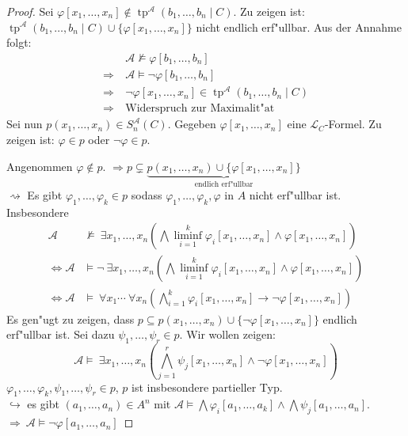 \documentclass[a4paper,12pt,numbers=noenddot,parskip=full]{scrartcl}
\newcommand{\Forall}{~\forall}
\newcommand{\Exists}{~\exists}
\newcommand{\scrL}{\mathcal{L}}
\newcommand{\scrA}{\mathcal{A}}
\DeclareMathOperator{\typ}{tp}
\theoremstyle{dotless}
\begin{document}
\begin{proof}
	Sei $\varphi[x_1, \dots, x_n] \notin \typ^\scrA (b_1, \dots, b_n \mid C)$. Zu zeigen ist: $\typ^\scrA (b_1, \dots, b_n \mid C) \cup \{\varphi[x_1, \dots, x_n] \}$ nicht endlich erf"ullbar. Aus der Annahme folgt:
	\begin{align*}
		&\scrA \not\models \varphi[b_1, \dots, b_n]\\
		\Longrightarrow~ &\scrA \models \lnot \varphi[b_1, \dots, b_n]\\
		\Longrightarrow~ &\lnot \varphi[x_1, \dots, x_n] \in \typ^\scrA(b_1, \dots, b_n \mid C)\\
		\Longrightarrow~ &\text{Widerspruch zur Maximalit"at}
	\end{align*}
	Sei nun $p (x_1, \dots, x_n) \in S^\scrA_n (C)$. Gegeben $\varphi[x_1, \dots, x_n]$ eine $\scrL_C$-Formel. Zu zeigen ist: $\varphi \in p$ oder $\lnot \varphi \in p$.
	
	Angenommen $\varphi \notin p$. $\Longrightarrow p \subsetneq \underbrace{p(x_1, \dots, x_n) \cup \{\varphi[x_1, \dots, x_n] \}}_\text{endlich erf"ullbar}$\\
	$\rightsquigarrow$ Es gibt $\varphi_1, \dots, \varphi_k \in p$ sodass $\varphi_1, \dots, \varphi_k, \varphi$ in $A$ nicht erf"ullbar ist. Insbesondere
	\begin{align*}
		\scrA &\not\models \Exists x_1, \dots, x_n (\bigwedge\liminf_{i=1}^k \varphi_i[x_1, \dots, x_n] \land \varphi[x_1, \dots, x_n])\\
		\Longleftrightarrow \scrA &\models \lnot \Exists x_1, \dots, x_n (\bigwedge\liminf_{i=1}^k \varphi_i[x_1, \dots, x_n] \land \varphi[x_1, \dots, x_n])\\
		\Longleftrightarrow \scrA &\models \Forall x_1 \cdots \Forall x_n (\bigwedge\limits_{i=1}^k \varphi_i[x_1, \dots, x_n] \rightarrow \lnot \varphi[x_1, \dots, x_n])
	\end{align*}
	Es gen"ugt zu zeigen, dass $p \subseteq p(x_1, \dots, x_n) \cup \{\lnot \varphi[x_1, \dots, x_n]\}$ endlich erf"ullbar ist. 
	Sei dazu $\psi_1, \dots, \psi_r \in p$. Wir wollen zeigen: 
	\begin{equation*}
		\scrA \models \Exists x_1, \dots, x_n (\bigwedge\limits_{j=1}^r \psi_j [x_1, \dots, x_n] \land \lnot \varphi[x_1, \dots, x_n])
	\end{equation*}
	$\varphi_1, \dots, \varphi_k, \psi_1, \dots, \psi_r \in p$, $p$ ist insbesondere partieller Typ.\\
	$\hookrightarrow$ es gibt $(a_1, \dots, a_n) \in A^n$ mit $\scrA \models \bigwedge \varphi_i[a_1, \dots, a_k] \land \bigwedge \psi_j[a_1, \dots, a_n]$.\\
	$\Longrightarrow~ \scrA \models \lnot \varphi[a_1, \dots, a_n]$
\end{proof}
\end{document}
